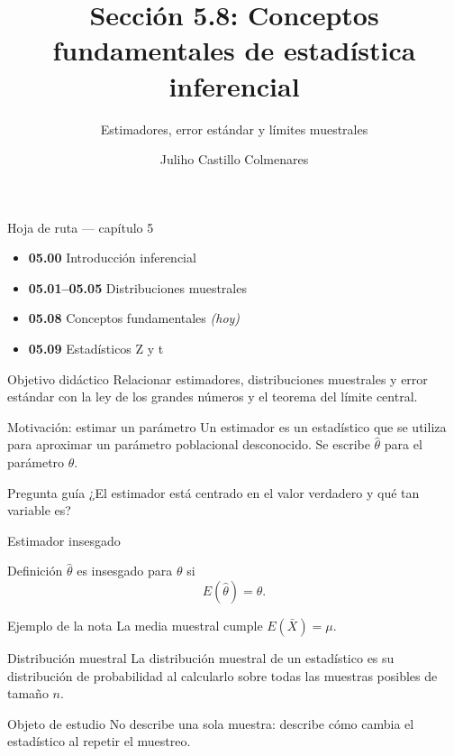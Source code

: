 \documentclass[10pt,aspectratio=169]{beamer}
\title[Conceptos fundamentales]{Sección 5.8: Conceptos fundamentales de estadística inferencial}
\subtitle{Estimadores, error estándar y límites muestrales}
\author[J. Castillo Colmenares]{Juliho Castillo Colmenares}
\institute{Tecnológico de Monterrey}
\date{}
\begin{document}
\begin{frame}[plain]\vspace{-0.8cm}\titlepage\end{frame}

\begin{frame}{Hoja de ruta --- capítulo 5}
  \footnotesize
  \begin{itemize}\itemsep=0.08cm
    \item \textbf{05.00} Introducción inferencial
    \item \textbf{05.01--05.05} Distribuciones muestrales
    \item \textbf{05.08} Conceptos fundamentales \emph{(hoy)}
    \item \textbf{05.09} Estadísticos Z y t
  \end{itemize}
  \begin{block}{Objetivo didáctico}
    Relacionar estimadores, distribuciones muestrales y error estándar con la
    ley de los grandes números y el teorema del límite central.
  \end{block}
\end{frame}

\begin{frame}{Motivación: estimar un parámetro}
  \footnotesize
  Un estimador es un estadístico que se utiliza para aproximar un parámetro
  poblacional desconocido. Se escribe $\hat\theta$ para el parámetro $\theta$.
  \begin{alertblock}{Pregunta guía}
    ¿El estimador está centrado en el valor verdadero y qué tan variable es?
  \end{alertblock}
\end{frame}

\begin{frame}{Estimador insesgado}
  \footnotesize
  \begin{block}{Definición}
    $\hat\theta$ es insesgado para $\theta$ si
    \[
      E(\hat\theta)=\theta.
    \]
  \end{block}
  \begin{exampleblock}{Ejemplo de la nota}
    La media muestral cumple $E(\bar X)=\mu$.
  \end{exampleblock}
\end{frame}

\begin{frame}{Distribución muestral}
  \footnotesize
  La distribución muestral de un estadístico es su distribución de probabilidad
  al calcularlo sobre todas las muestras posibles de tamaño $n$.
  \begin{block}{Objeto de estudio}
    No describe una sola muestra: describe cómo cambia el estadístico al
    repetir el muestreo.
  \end{block}
\end{frame}
\end{document}
